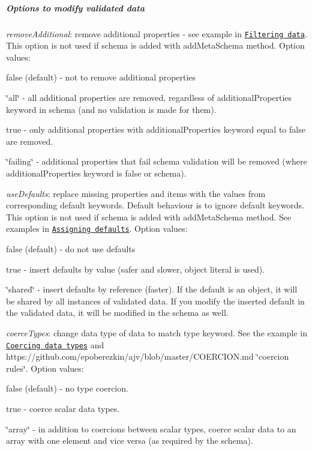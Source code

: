 \subparagraph*{Options to modify validated data}


\begin{DoxyItemize}
\item {\itshape remove\+Additional}\+: remove additional properties -\/ see example in \href{#filtering-data}{\tt Filtering data}. This option is not used if schema is added with {\ttfamily add\+Meta\+Schema} method. Option values\+:
\begin{DoxyItemize}
\item {\ttfamily false} (default) -\/ not to remove additional properties
\item {\ttfamily \char`\"{}all\char`\"{}} -\/ all additional properties are removed, regardless of {\ttfamily additional\+Properties} keyword in schema (and no validation is made for them).
\item {\ttfamily true} -\/ only additional properties with {\ttfamily additional\+Properties} keyword equal to {\ttfamily false} are removed.
\item {\ttfamily \char`\"{}failing\char`\"{}} -\/ additional properties that fail schema validation will be removed (where {\ttfamily additional\+Properties} keyword is {\ttfamily false} or schema).
\end{DoxyItemize}
\item {\itshape use\+Defaults}\+: replace missing properties and items with the values from corresponding {\ttfamily default} keywords. Default behaviour is to ignore {\ttfamily default} keywords. This option is not used if schema is added with {\ttfamily add\+Meta\+Schema} method. See examples in \href{#assigning-defaults}{\tt Assigning defaults}. Option values\+:
\begin{DoxyItemize}
\item {\ttfamily false} (default) -\/ do not use defaults
\item {\ttfamily true} -\/ insert defaults by value (safer and slower, object literal is used).
\item {\ttfamily \char`\"{}shared\char`\"{}} -\/ insert defaults by reference (faster). If the default is an object, it will be shared by all instances of validated data. If you modify the inserted default in the validated data, it will be modified in the schema as well.
\end{DoxyItemize}
\item {\itshape coerce\+Types}\+: change data type of data to match {\ttfamily type} keyword. See the example in \href{#coercing-data-types}{\tt Coercing data types} and https\+://github.com/epoberezkin/ajv/blob/master/\+C\+O\+E\+R\+C\+I\+O\+N.\+md \char`\"{}coercion rules\char`\"{}. Option values\+:
\begin{DoxyItemize}
\item {\ttfamily false} (default) -\/ no type coercion.
\item {\ttfamily true} -\/ coerce scalar data types.
\item {\ttfamily \char`\"{}array\char`\"{}} -\/ in addition to coercions between scalar types, coerce scalar data to an array with one element and vice versa (as required by the schema).
\end{DoxyItemize}
\end{DoxyItemize}

